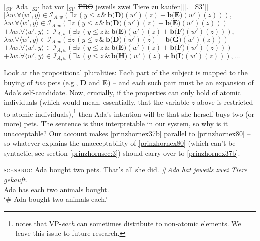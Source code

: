 \documentclass[output=paper,colorlinks,citecolor=brown,
]{langscibook}
\newcommand{\sem}[2]{\mbox{$[\![${#2}$]\!]^{#1}$}} %
\begin{document}
\ea
\ea  \label{prinzhornex63a} [$_{S3'}$ Ada [$_{S2'}$ hat vor [$_{S1'}$ \sout{PRO} jeweils zwei Tiere zu kaufen]]].
\ex \sem{}{S3'} = $[\lambda w.  \forall \langle w' ,y \rangle \in \mathcal{I}_{A,w} (\exists  z \,(y \le z\, \& \,\textbf{b(D)}(w')(z)+\textbf{b(E)}(w')(z))),$\\$
\lambda w.  \forall \langle w' ,y \rangle \in \mathcal{I}_{A,w} (\exists  z \,(y \le z\, \& \,\textbf{b(D)}(w')(z)+\textbf{b(E)}(w')(z))) $\\$
+ \lambda w.  \forall \langle w' ,y \rangle \in \mathcal{I}_{A,w} (\exists  z \,(y \le z\, \& \,\textbf{b(E)}(w')(z)+\textbf{b(F)}(w')(z))), $\\$
\lambda w.  \forall \langle w' ,y \rangle \in \mathcal{I}_{A,w} (\exists z\,( y \le z\, \& \,\textbf{b(D)}(w')(z) + \textbf{b(G)}(w')(z)))$\\$ + \lambda w.  \forall \langle w' ,y \rangle \in \mathcal{I}_{A,w} (\exists z \, (y \le z\,\& \,\textbf{b(E)}(w')(z)+\textbf{b(F)}(w')(z))) $\\$ + \lambda w.  \forall \langle w' ,y \rangle \in \mathcal{I}_{A,w} (\exists z \,(y \le z\, \& \,\textbf{b(H)}(w')(z)+\textbf{b(I)}(w')(z))), \dots]$\label{prinzhornex63b}
\z\z

Look at the propositional pluralities: Each part of the subject is mapped  to the buying of \textit{two} pets (e.g., {\bf D} and {\bf E}) -- and each such part must be an expansion of Ada's self-candidate. Now, crucially, if the properties can only hold of atomic individuals (which would mean, essentially, that the variable $z$ above is restricted to atomic individuals),\footnote{\cite{Schwarzschild:1996} notes that VP-\textit{each} can sometimes distribute to non-atomic elements. We leave this issue to future research.} then Ada's intention will be that she herself buys two (or more) pets. The sentence is thus interpretable in our system, so why is it unacceptable? Our account makes \ref{prinzhornex37b} parallel to \ref{prinzhornex80} -- so whatever explains the unacceptability of \ref{prinzhornex80} (which can't be syntactic, see section \ref{prinzhornsec:3}) should carry over to \ref{prinzhornex37b}.




\ea 
\ea \textsc{scenario:} Ada bought two pets. That's all she did.
\ex \gll $\#$\textit{Ada} \textit{hat} \textit{jeweils} \textit{zwei} \textit{Tiere} \textit{gekauft}.\\
	Ada has each two animals bought.\\
	\glt `$\#$ Ada bought two animals each.' \label{prinzhornex80}
	\z\z
\end{document}
